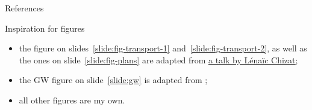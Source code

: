 \documentclass[9pt,xcolor={dvipsnames}]{beamer}
\begin{document}
\appendix


\begin{frame}[allowframebreaks]{References}

    
    

  \end{frame}

\begin{frame}{Inspiration for figures}
    \begin{itemize}
        \item the figure on slides~\ref{slide:fig-transport-1} and~\ref{slide:fig-transport-2}, as well as the ones on slide~\ref{slide:fig-plans} are adapted from \href{https://lchizat.github.io/files/presentations/chizat2019IFCAM_OT.pdf}{\underline{a talk by Lénaïc Chizat}};
        \item the GW figure on slide~\ref{slide:gw} is adapted from \cite{peyre2019computational};
        \item all other figures are my own.
    \end{itemize}
\end{frame}
\end{document}
